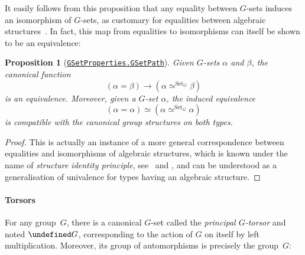 \documentclass[10pt,a4paper]{amsart}
\newtheorem{proposition}[theorem]{Proposition}
\theoremstyle{definition}
\newcommand{\equivto}{\simeq} %
\let\P\undefined
\newcommand{\P}[1]{\operatorname{P}_{#1}} %
\newcommand{\Set}{\operatorname{Set}} %
\newcommand{\GSet}[1][G]{\Set_{#1}} %
\newcommand{\GSetEquiv}[3][G]{#2\simeq^{\GSet[#1]}#3} %
\newcommand{\ie}{i.e.~}
\newcommand{\agda}[2]{\href{https://smimram.github.io/generated-deloopings-agda/#1.html\##2}{\texttt{#1.#2}}}
\newcommand{\TODO}[1]{\marginpar{\tiny #1}}
\newcommand{\AR}[1]{\TODO{AR: #1}} %
\begin{document}
\noindent
It easily follows from this proposition that any equality between $G$-sets
induces an isomorphism of $G$-sets, as customary for equalities between
algebraic structures~\cite[Section~2.14]{hottbook}. In fact, this map from
equalities to isomorphisms can itself be shown to be an equivalence:

\begin{proposition}[\agda{GSetProperties}{GSetPath}]
  \label{GSet-SIP}
  Given $G$-sets $\alpha$ and $\beta$, the canonical function
  \[
    (\alpha=\beta)\to(\GSetEquiv\alpha\beta)
  \]
  is an equivalence.
  Moreover, given a $G$-set $\alpha$, the induced equivalence
  \[
    (\alpha=\alpha)\equivto(\GSetEquiv\alpha\alpha)
  \]
  is compatible with the canonical group structures on both types.
\end{proposition}
\begin{proof}
  This is actually an instance of a more general correspondence between
  equalities and isomorphisms of algebraic structures, which is known under the
  name of \emph{structure identity
    principle}, see~\cite{coquand2013isomorphism} and \cite[Section~9.8]{hottbook}, and can be understood as a
  generalisation of univalence for types having an algebraic structure.
\end{proof}

\paragraph{Torsors}
For any group~$G$, there is a canonical $G$-set called the \emph{principal $G$-torsor} and
noted $\P G$, corresponding to the action of $G$ on itself by left
multiplication. Moreover, its group of automorphisms is precisely the group~$G$:
\end{document}
